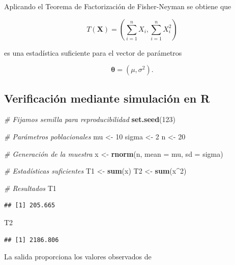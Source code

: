 \documentclass[
  11pt,
]{report}
\newenvironment{Shaded}{\begin{snugshade}}{\end{snugshade}}
\newcommand{\AttributeTok}[1]{\textcolor[rgb]{0.13,0.29,0.53}{#1}}
\newcommand{\CommentTok}[1]{\textcolor[rgb]{0.56,0.35,0.01}{\textit{#1}}}
\newcommand{\DecValTok}[1]{\textcolor[rgb]{0.00,0.00,0.81}{#1}}
\newcommand{\FunctionTok}[1]{\textcolor[rgb]{0.13,0.29,0.53}{\textbf{#1}}}
\newcommand{\NormalTok}[1]{#1}
\newcommand{\OtherTok}[1]{\textcolor[rgb]{0.56,0.35,0.01}{#1}}
\newcommand{\SpecialCharTok}[1]{\textcolor[rgb]{0.81,0.36,0.00}{\textbf{#1}}}
\begin{document}
Aplicando el Teorema de Factorización de Fisher-Neyman se obtiene que

\[T(\mathbf{X})=
\left(
\sum_{i=1}^{n}X_i,
\sum_{i=1}^{n}X_i^2
\right)\]

es una estadística suficiente para el vector de parámetros

\[\boldsymbol{\theta}=(\mu,\sigma^2).\]

\subsection{Verificación mediante simulación en
R}\label{verificaciuxf3n-mediante-simulaciuxf3n-en-r}

\begin{Shaded}
\begin{Highlighting}[]
\CommentTok{\# Fijamos semilla para reproducibilidad}
\FunctionTok{set.seed}\NormalTok{(}\DecValTok{123}\NormalTok{)}

\CommentTok{\# Parámetros poblacionales}
\NormalTok{mu }\OtherTok{\textless{}{-}} \DecValTok{10}
\NormalTok{sigma }\OtherTok{\textless{}{-}} \DecValTok{2}
\NormalTok{n }\OtherTok{\textless{}{-}} \DecValTok{20}

\CommentTok{\# Generación de la muestra}
\NormalTok{x }\OtherTok{\textless{}{-}} \FunctionTok{rnorm}\NormalTok{(n, }\AttributeTok{mean =}\NormalTok{ mu, }\AttributeTok{sd =}\NormalTok{ sigma)}

\CommentTok{\# Estadísticas suficientes}
\NormalTok{T1 }\OtherTok{\textless{}{-}} \FunctionTok{sum}\NormalTok{(x)}
\NormalTok{T2 }\OtherTok{\textless{}{-}} \FunctionTok{sum}\NormalTok{(x}\SpecialCharTok{\^{}}\DecValTok{2}\NormalTok{)}

\CommentTok{\# Resultados}
\NormalTok{T1}
\end{Highlighting}
\end{Shaded}

\begin{verbatim}
## [1] 205.665
\end{verbatim}

\begin{Shaded}
\begin{Highlighting}[]
\NormalTok{T2}
\end{Highlighting}
\end{Shaded}

\begin{verbatim}
## [1] 2186.806
\end{verbatim}

La salida proporciona los valores observados de
\end{document}
